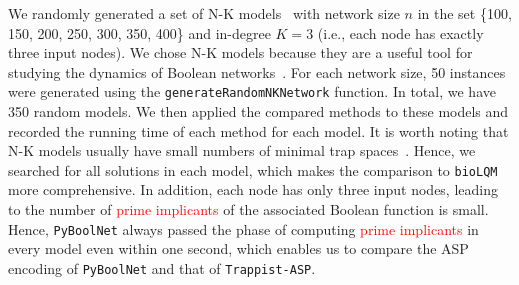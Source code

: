 \documentclass[preprint,12pt]{elsarticle}
\newcommand{\change}[1]{\textcolor{red}{#1}}
\begin{document}
We randomly generated a set of N-K models~\cite{glass1973logical} with network size \(n\) in the set \{100, 150, 200, 250, 300, 350, 400\} and in-degree \(K = 3\) (i.e., each node has exactly three input nodes).
We chose N-K models because they are a useful tool for studying the dynamics of Boolean networks~\cite{glass1973logical,klarner2015computing,Rozum2021}.
For each network size, 50 instances were generated using the \verb|generateRandomNKNetwork| function.
In total, we have 350 random models.
We then applied the compared methods to these models and recorded the running time of each method for each model.
It is worth noting that N-K models usually have small numbers of minimal trap spaces~\cite{klarner2015computing}.
Hence, we searched for all solutions in each model, which makes the comparison to \texttt{bioLQM} more comprehensive.
In addition, each node has only three input nodes, leading to the number of \change{prime implicants} of the associated Boolean function is small.
Hence, \texttt{PyBoolNet} always passed the phase of computing \change{prime implicants} in every model even within one second, which enables us to compare the ASP encoding of \texttt{PyBoolNet} and that of \texttt{Trappist-ASP}.
\end{document}

